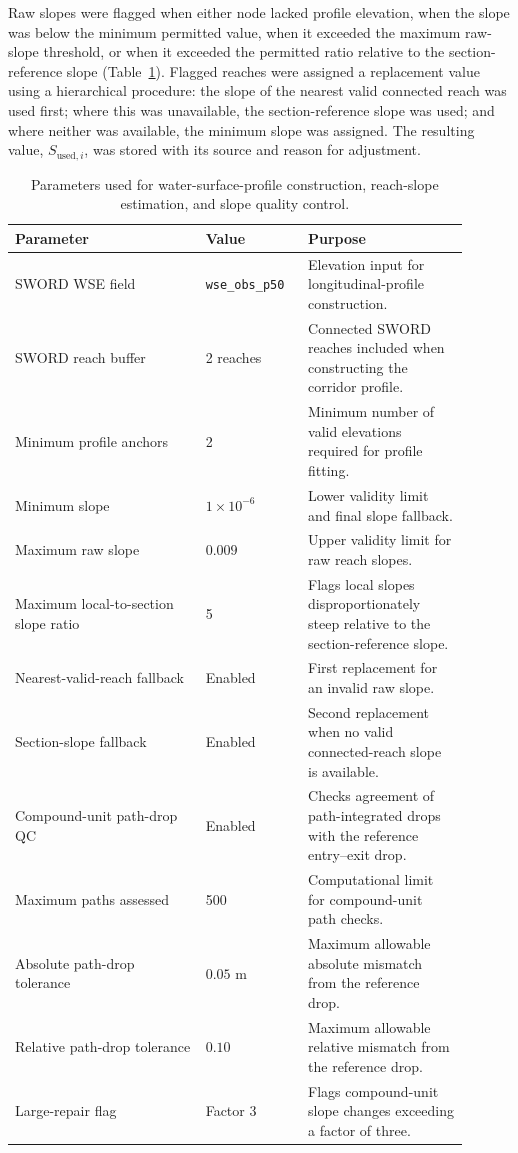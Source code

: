 Raw slopes were flagged when either node lacked profile elevation, when the slope was below the minimum permitted value, when it exceeded the maximum raw-slope threshold, or when it exceeded the permitted ratio relative to the section-reference slope (Table~\ref{tab:slope_parameters}). Flagged reaches were assigned a replacement value using a hierarchical procedure: the slope of the nearest valid connected reach was used first; where this was unavailable, the section-reference slope was used; and where neither was available, the minimum slope was assigned. The resulting value, $S_{\mathrm{used},i}$, was stored with its source and reason for adjustment.

\begin{table}[ht]
\centering
\caption{Parameters used for water-surface-profile construction, reach-slope estimation, and slope quality control.}
\label{tab:slope_parameters}
\begin{tabular}{p{0.38\linewidth}p{0.20\linewidth}p{0.32\linewidth}}
\hline
Parameter & Value & Purpose \\
\hline
SWORD WSE field & \texttt{wse\_obs\_p50} & Elevation input for longitudinal-profile construction. \\
SWORD reach buffer & 2 reaches & Connected SWORD reaches included when constructing the corridor profile. \\
Minimum profile anchors & 2 & Minimum number of valid elevations required for profile fitting. \\
Minimum slope & $1\times10^{-6}$ & Lower validity limit and final slope fallback. \\
Maximum raw slope & $0.009$ & Upper validity limit for raw reach slopes. \\
Maximum local-to-section slope ratio & 5 & Flags local slopes disproportionately steep relative to the section-reference slope. \\
Nearest-valid-reach fallback & Enabled & First replacement for an invalid raw slope. \\
Section-slope fallback & Enabled & Second replacement when no valid connected-reach slope is available. \\
Compound-unit path-drop QC & Enabled & Checks agreement of path-integrated drops with the reference entry--exit drop. \\
Maximum paths assessed & 500 & Computational limit for compound-unit path checks. \\
Absolute path-drop tolerance & $0.05$ m & Maximum allowable absolute mismatch from the reference drop. \\
Relative path-drop tolerance & $0.10$ & Maximum allowable relative mismatch from the reference drop. \\
Large-repair flag & Factor 3 & Flags compound-unit slope changes exceeding a factor of three. \\
\hline
\end{tabular}
\end{table}

